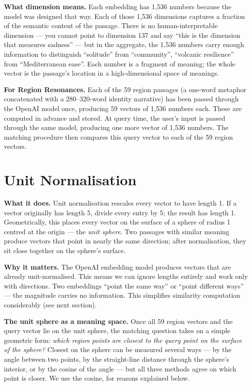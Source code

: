 \documentclass[11pt]{article}
\begin{document}
\textbf{What dimension means.} Each embedding has 1{,}536 numbers because the model was designed that way. Each of those 1{,}536 dimensions captures a fraction of the semantic content of the passage. There is no human-interpretable dimension --- you cannot point to dimension 137 and say ``this is the dimension that measures sadness'' --- but in the aggregate, the 1{,}536 numbers carry enough information to distinguish ``solitude'' from ``community'', ``volcanic resilience'' from ``Mediterranean ease''. Each number is a fragment of meaning; the whole vector is the passage's location in a high-dimensional space of meanings.

\textbf{For Region Resonances.} Each of the 59 region passages (a one-word metaphor concatenated with a 280--320-word identity narrative) has been passed through the OpenAI model once, producing 59 vectors of 1{,}536 numbers each. These are computed in advance and stored. At query time, the user's input is passed through the same model, producing one more vector of 1{,}536 numbers. The matching procedure then compares this query vector to each of the 59 region vectors.

\section{Unit Normalisation}

\textbf{What it does.} Unit normalisation rescales every vector to have length 1. If a vector originally has length 5, divide every entry by 5; the result has length 1. Geometrically, this places every vector on the surface of a sphere of radius 1 centred at the origin --- the \emph{unit sphere}. Two passages with similar meaning produce vectors that point in nearly the same direction; after normalisation, they sit close together on the sphere's surface.

\textbf{Why it matters.} The OpenAI embedding model produces vectors that are already unit-normalised. This means we can ignore lengths entirely and work only with directions. Two embeddings ``point the same way'' or ``point different ways'' --- the magnitude carries no information. This simplifies similarity computation considerably (see next section).

\textbf{The unit sphere as a meaning space.} Once all 59 region vectors and the query vector lie on the unit sphere, the matching question takes on a simple geometric form: \emph{which region points are closest to the query point on the surface of the sphere?} Closest on the sphere can be measured several ways --- by the angle between two points, by the straight-line distance through the sphere's interior, or by the cosine of the angle --- but all three methods agree on which point is closer. We use the cosine, for reasons explained below.
\end{document}
